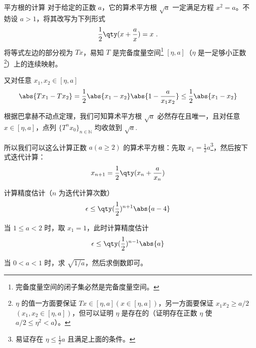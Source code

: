 \begin{example}{平方根的计算}
对于给定的正数 $a$，它的算术平方根 $\sqrt{a}$ 一定满足方程 $x^2=a$。不妨设 $a>1$，将其改写为下列形式
\begin{equation}
\frac{1}{2}\qty(x+\frac{a}{x})=x~.
\end{equation}
将等式左边的部分视为 $Tx$，易知 $T$ 是完备度量空间\footnote{完备度量空间的闭子集必然是完备度量空间。} $[\eta,a]$（$\eta$ 是一足够小正数\footnote{$\eta$ 的值一方面要保证 $Tx\in[\eta,a](x\in[\eta,a])$，另一方面要保证 $x_1x_2 \geq a/2$ $(x_1,x_2\in[\eta,a])$，但可以证明 $\eta$ 是存在的（证明存在正数 $\eta$ 使 $a/2\leq \eta^2<a$）。}）上的连续映射。

又对任意 $x_1,x_2\in [\eta,a]$
\begin{equation}
\abs{Tx_1 -  Tx_2}=\frac{1}{2}\abs{x_1 - x_2}\abs{1-\frac{a}{x_1x_2}}\leq\frac{1}{2}\abs{x_1 - x_2}
\end{equation}

根据巴拿赫不动点定理，我们可知算术平方根 $\sqrt{a}$ 必然存在且唯一，且对任意 $x\in[\eta,a]$，点列 $\{T^nx_0\}_{n\in\mathbb{N}}$ 均收敛到 $\sqrt{a}$.

所以我们可以这么计算正数 $a(a\geq 2)$ 的算术平方根：先取 $x_1=\frac{1}{2}a$\footnote{易证存在 $\eta\leq\frac{1}{2}a$ 且满足上面的条件。}，然后按下式迭代计算：
\begin{equation}
x_{n+1}=\frac{1}{2}\qty(x_n+\frac{a}{x_n})
\end{equation}

计算精度估计（$n$ 为迭代计算次数）
\begin{equation}
\epsilon\leq\qty(\frac{1}{2})^{n+1}\abs{a-4}
\end{equation}

当 $1\leq a<2$ 时，取 $x_1=1$，此时计算精度估计
\begin{equation}
\epsilon\leq\qty(\frac{1}{2})^{n-1}\abs{a}
\end{equation}

当 $0<a<1$ 时，求 $\sqrt{1/a}$，然后求倒数即可。
\end{example}
